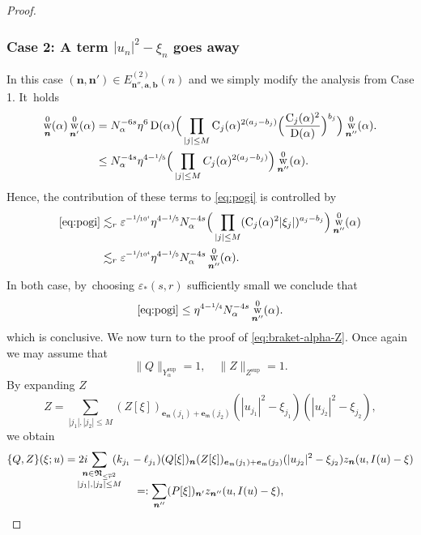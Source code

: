 \documentclass[JEP,XML,SOM,Unicode,published]{cedram}
\DeclareMathOperator{\rw}{w}
\theoremstyle{plain}
\theoremstyle{definition}
\newcommand{\nb}{{\boldsymbol n}}
\newcommand{\Nb}{{\boldsymbol{\mathfrak{N}}}}
\newcommand{\1}{\mathbf{1}}
\newcommand{\Ysup}[1]{Y_{#1}^{\mathrm{sup}}}
\let\epsilon\varepsilon
\begin{document}
\begin{proof}
\subsubsection*{Case 2: A term $|u_n|^{2}-\xi_{n}$ goes away}
In this case $(\nb,\nb')\in E_{\nb'',\boldsymbol{a},\boldsymbol{b}}^{(2)}(n)$ and we simply modify the analysis from Case 1. It~holds
\begin{align}
\nonumber
\rw_{\nb}^{0}(\alpha)\rw_{\nb'}^{0}(\alpha) &=
N_{\alpha}^{-6s}\eta^{6}\operatorname{D}(\alpha)
\Big(
\prod_{|j|\leq M}\operatorname{C}_{j}(\alpha)^{2(a_{j}-b_{j})}\Big(\frac{\operatorname{C}_{j}(\alpha)^{2}}{\operatorname{D}(\alpha)}\Big)^{b_{j}}
\Big)
\rw_{\nb''}^{0}(\alpha).\\
&\leq N_{\alpha}^{-4s}\eta^{4-\sfrac{1}{5}}
\Big(
\prod_{|j|\leq M}C_{j}(\alpha)^{2(a_{j}-b_{j})}
\Big)
\rw_{\nb''}^{0}(\alpha).
\label{eq:pr-w2}
\end{align}
Hence, the contribution of these terms to \eqref{eq:pogi} is controlled by
\begin{align*}
\eqref{eq:pogi}
&\lesssim_{r}\epsilon^{-\sfrac{1}{10^{4}}}
\eta^{4-\sfrac{1}{5}}
N_{\alpha}^{-4s}
\Big(\prod_{|j|\leq M}(\mathrm{C}_{j}(\alpha)^{2}|\xi_{j}|)^{a_{j}-b_{j}}
\Big)
\rw_{\nb''}^{0}(\alpha) \\
&\lesssim_{r}
\epsilon^{-\sfrac{1}{10^{4}}}
\eta^{4-\sfrac{1}{5}}
N_{\alpha}^{-4s}
\rw_{\nb''}^{0}(\alpha).
\end{align*}
In both case, by~choosing $\epsilon_{\ast}(s,r)$ sufficiently small we conclude that
\[
\eqref{eq:pogi} \leq \eta^{4-\sfrac{1}{4}}N_{\alpha}^{-4s}
\rw_{\nb''}^{0}(\alpha).
\]
which is conclusive.
We now turn to the proof of \eqref{eq:braket-alpha-Z}. Once again we may assume that
\[
\|Q\|_{\Ysup{\alpha}}=1,\quad
\|Z\|_{Z^{\mathrm{sup}}}=1.
\]
By expanding $Z$
\[
Z = \sum_{|j_{1}|,|j_{2}|\leq M}
(Z[\xi])_{\boldsymbol{e}_{\mathfrak{m}}(j_{1})+\boldsymbol{e}_{\mathfrak{m}}(j_{2})}
(|u_{j_1}|^2-\xi_{j_{1}})(|u_{j_{2}}|^{2}-\xi_{j_{2}}),
\]
we obtain
\begin{multline*}
\{Q,Z\}(\xi;u)
= 2i\hspace*{-4mm}\sum_{\substack{\nb\in\Nb_{\leq\overline{r}^{2}} \\ |j_{1}|,|j_{2}|\leq M}}\hspace*{-3mm}
(k_{j_{1}}-\ell_{j_{1}})
(Q[\xi])_{\nb}
(Z[\xi])_{\boldsymbol{e}_{\mathfrak{m}}(j_{1})+\boldsymbol{e}_{\mathfrak{m}}(j_{2})}
(|u_{j_{2}}|^{2}-\xi_{j_{2}})
z_{\nb}(u,I(u)-\xi) \\[
-10pt]
=:\sum_{\nb''}(P[\xi])_{\nb'}z_{\nb''}(u,I(u)-\xi),

\end{multline*}
\end{proof}
\end{document}
